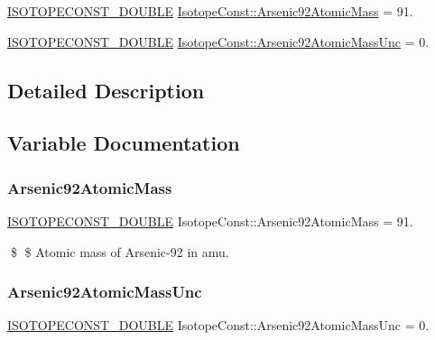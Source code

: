 \begin{DoxyCompactItemize}
\item 
\mbox{\hyperlink{group___isotope_const-_macros_ga8f45a7272ce02c0b4c65c44636ed719a}{I\+S\+O\+T\+O\+P\+E\+C\+O\+N\+S\+T\+\_\+\+D\+O\+U\+B\+LE}} \mbox{\hyperlink{group___isotope_const-_arsenic-_as92_ga34607b67267816678207bf2e98c33601}{Isotope\+Const\+::\+Arsenic92\+Atomic\+Mass}} = 91.
\item 
\mbox{\hyperlink{group___isotope_const-_macros_ga8f45a7272ce02c0b4c65c44636ed719a}{I\+S\+O\+T\+O\+P\+E\+C\+O\+N\+S\+T\+\_\+\+D\+O\+U\+B\+LE}} \mbox{\hyperlink{group___isotope_const-_arsenic-_as92_ga1a98920f366a27d2eeb9575f9245013e}{Isotope\+Const\+::\+Arsenic92\+Atomic\+Mass\+Unc}} = 0.
\end{DoxyCompactItemize}


\subsection{Detailed Description}


\subsection{Variable Documentation}
\mbox{\label{group___isotope_const-_arsenic-_as92_ga34607b67267816678207bf2e98c33601}} 
\subsubsection{\texorpdfstring{Arsenic92\+Atomic\+Mass}{Arsenic92AtomicMass}}
{\footnotesize\ttfamily \mbox{\hyperlink{group___isotope_const-_macros_ga8f45a7272ce02c0b4c65c44636ed719a}{I\+S\+O\+T\+O\+P\+E\+C\+O\+N\+S\+T\+\_\+\+D\+O\+U\+B\+LE}} Isotope\+Const\+::\+Arsenic92\+Atomic\+Mass = 91.}

\$ \$ Atomic mass of Arsenic-\/92 in amu. \mbox{\label{group___isotope_const-_arsenic-_as92_ga1a98920f366a27d2eeb9575f9245013e}} 
\subsubsection{\texorpdfstring{Arsenic92\+Atomic\+Mass\+Unc}{Arsenic92AtomicMassUnc}}
{\footnotesize\ttfamily \mbox{\hyperlink{group___isotope_const-_macros_ga8f45a7272ce02c0b4c65c44636ed719a}{I\+S\+O\+T\+O\+P\+E\+C\+O\+N\+S\+T\+\_\+\+D\+O\+U\+B\+LE}} Isotope\+Const\+::\+Arsenic92\+Atomic\+Mass\+Unc = 0.}

